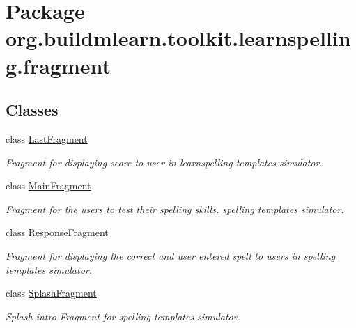 \hypertarget{namespaceorg_1_1buildmlearn_1_1toolkit_1_1learnspelling_1_1fragment}{}\section{Package org.\+buildmlearn.\+toolkit.\+learnspelling.\+fragment}
\label{namespaceorg_1_1buildmlearn_1_1toolkit_1_1learnspelling_1_1fragment}
\subsection*{Classes}
\begin{DoxyCompactItemize}
\item 
class \hyperlink{classorg_1_1buildmlearn_1_1toolkit_1_1learnspelling_1_1fragment_1_1LastFragment}{Last\+Fragment}
\begin{DoxyCompactList}\small\item\em Fragment for displaying score to user in learnspelling template\textquotesingle{}s simulator. \end{DoxyCompactList}\item 
class \hyperlink{classorg_1_1buildmlearn_1_1toolkit_1_1learnspelling_1_1fragment_1_1MainFragment}{Main\+Fragment}
\begin{DoxyCompactList}\small\item\em Fragment for the users to test their spelling skills. spelling template\textquotesingle{}s simulator. \end{DoxyCompactList}\item 
class \hyperlink{classorg_1_1buildmlearn_1_1toolkit_1_1learnspelling_1_1fragment_1_1ResponseFragment}{Response\+Fragment}
\begin{DoxyCompactList}\small\item\em Fragment for displaying the correct and user entered spell to users in spelling template\textquotesingle{}s simulator. \end{DoxyCompactList}\item 
class \hyperlink{classorg_1_1buildmlearn_1_1toolkit_1_1learnspelling_1_1fragment_1_1SplashFragment}{Splash\+Fragment}
\begin{DoxyCompactList}\small\item\em Splash intro Fragment for spelling template\textquotesingle{}s simulator. \end{DoxyCompactList}\end{DoxyCompactItemize}

